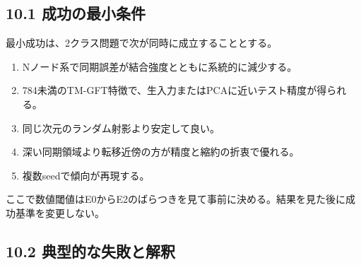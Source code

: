 \documentclass[11pt,a4paper]{ltjsarticle}
\begin{document}

\subsection*{\textcolor{researchblue}{10.1 成功の最小条件}}

最小成功は、2クラス問題で次が同時に成立することとする。\par

\begin{enumerate}

\item Nノード系で同期誤差が結合強度とともに系統的に減少する。

\item 784未満のTM-GFT特徴で、生入力またはPCAに近いテスト精度が得られる。

\item 同じ次元のランダム射影より安定して良い。

\item 深い同期領域より転移近傍の方が精度と縮約の折衷で優れる。

\item 複数seedで傾向が再現する。

\end{enumerate}

ここで数値閾値はE0からE2のばらつきを見て事前に決める。結果を見た後に成功基準を変更しない。\par

\subsection*{\textcolor{researchblue}{10.2 典型的な失敗と解釈}}
\end{document}
